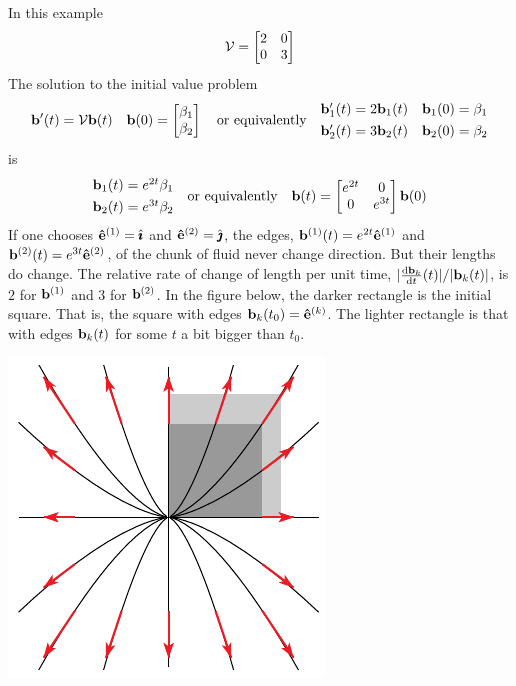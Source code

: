 \begin{eg}[$\vv(x,y)= 2x\hi+3y\hj$]\label{eg:flowExpand}
In this example
\begin{equation*}
\mathcal{V}=\left[\begin{matrix}2&0\\ 0&3\end{matrix}\right]
\end{equation*}
The solution to the initial value problem
\begin{equation*}
\mathbf{b}'(t)=\mathcal{V}\mathbf{b}(t)\quad 
      \mathbf{b}(0)=\left[\begin{matrix}\beta_1\cr\beta_2\end{matrix}\right]
\quad\text{or equivalently}\quad
\begin{matrix}\mathbf{b}_1'(t)=2\mathbf{b}_1(t) & \mathbf{b}_1(0)=\beta_1\\[0.05in]
        \mathbf{b}_2'(t)=3\mathbf{b}_2(t) & \mathbf{b}_2(0)=\beta_2\end{matrix}
\end{equation*}
is
\begin{equation*}
\begin{matrix}\mathbf{b}_1(t)=e^{2t}\beta_1\\[0.05in]
        \mathbf{b}_2(t)=e^{3t}\beta_2\end{matrix}
\quad\text{or equivalently}\quad
\mathbf{b}(t)=\left[\begin{matrix}e^{2t}&0\\ 0&e^{3t}\end{matrix}\right]\mathbf{b}(0)
\end{equation*}
If one chooses $\mathbf{\hat e}^{(1)}=\hat{\pmb{\imath}}$ and $\mathbf{\hat e}^{(2)}=\hat{\pmb{\jmath}}$, the edges, 
$\mathbf{b}^{(1)}(t)=e^{2t}\mathbf{\hat e}^{(1)}$ and  $\mathbf{b}^{(2)}(t)=e^{3t}\mathbf{\hat e}^{(2)}$, of the chunk of
fluid never change direction. But their lengths do change. The relative rate
of change of length per unit time, $|\diff{\vb_k}{t}(t)|/|\vb_k(t)|$, 
is $2$ for $\mathbf{b}^{(1)}$ and 3 for $\mathbf{b}^{(2)}$. In the figure below, the darker
rectangle is the initial square. That is, the square with edges $\mathbf{b}_k(t_0)=\mathbf{\hat e}^{(k)}$.
The lighter rectangle is that with edges $\mathbf{b}_k(t)$ for some $t$ a bit
bigger than $t_0$.

\begin{nfig}
\begin{center}
    \includegraphics{square1.pdf}
\end{center}
\end{nfig}

\end{eg}

